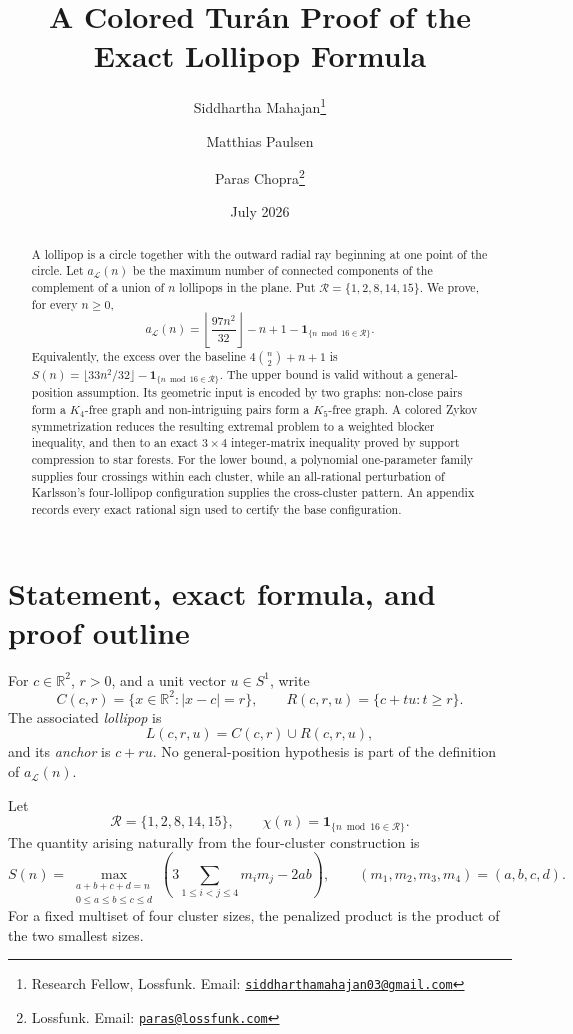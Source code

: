 \documentclass[11pt]{article}
\theoremstyle{plain}
\theoremstyle{definition}
\theoremstyle{remark}
\newcommand{\Lop}{\mathcal L}
\newcommand{\R}{\mathbb R}
\newcommand{\1}{\mathbf 1}
\begin{document}
\title{A Colored Tur\'an Proof of the Exact Lollipop Formula}
\author{%
Siddhartha Mahajan\thanks{Research Fellow, Lossfunk. Email: \href{mailto:siddharthamahajan03@gmail.com}{\texttt{siddharthamahajan03@gmail.com}}}
\and Matthias Paulsen
\and Paras Chopra\thanks{Lossfunk. Email: \href{mailto:paras@lossfunk.com}{\texttt{paras@lossfunk.com}}}}
\date{July 2026}
\maketitle

\begin{abstract}
A lollipop is a circle together with the outward radial ray beginning at one
point of the circle.  Let $a_{\Lop}(n)$ be the maximum number of connected
components of the complement of a union of $n$ lollipops in the plane.  Put
$\mathcal R=\{1,2,8,14,15\}$.  We prove, for every $n\geq0$,
\[
 a_{\Lop}(n)=
 \left\lfloor\frac{97n^2}{32}\right\rfloor-n+1
 -\1_{\{n\bmod16\in\mathcal R\}}.
\]
Equivalently, the excess over the baseline $4\binom n2+n+1$ is
$S(n)=\lfloor33n^2/32\rfloor-
\1_{\{n\bmod16\in\mathcal R\}}$.  The upper bound is valid without a
general-position assumption.  Its geometric input is encoded by two graphs:
non-close pairs form a $K_4$-free graph and non-intriguing pairs form a
$K_5$-free graph.  A colored Zykov symmetrization reduces the resulting
extremal problem to a weighted blocker inequality, and then to an exact
$3\times4$ integer-matrix inequality proved by support compression to star
forests.  For the lower bound, a polynomial one-parameter family supplies
four crossings within each cluster, while an all-rational perturbation of
Karlsson's four-lollipop configuration supplies the cross-cluster pattern.
An appendix records every exact rational sign used to certify the base
configuration.
\end{abstract}

\section{Statement, exact formula, and proof outline}\label{sec:statement}

For $c\in\R^2$, $r>0$, and a unit vector $u\in S^1$, write
\[
 C(c,r)=\{x\in\R^2:|x-c|=r\},\qquad
 R(c,r,u)=\{c+tu:t\geq r\}.
\]
The associated \emph{lollipop} is
\[
 L(c,r,u)=C(c,r)\cup R(c,r,u),
\]
and its \emph{anchor} is $c+ru$.  No general-position hypothesis is part of
the definition of $a_{\Lop}(n)$.

Let
\[
 \mathcal R=\{1,2,8,14,15\},\qquad
 \chi(n)=\1_{\{n\bmod16\in\mathcal R\}}.
\]
The quantity arising naturally from the four-cluster construction is
\begin{equation}\label{eq:Sdef}
 S(n)=\max_{\substack{a+b+c+d=n\\0\leq a\leq b\leq c\leq d}}
 \left(3\sum_{1\leq i<j\leq4}m_i m_j-2ab\right),
 \qquad (m_1,m_2,m_3,m_4)=(a,b,c,d).
\end{equation}
For a fixed multiset of four cluster sizes, the penalized product is the
product of the two smallest sizes.
\end{document}
